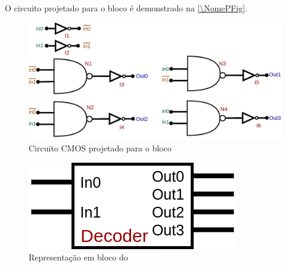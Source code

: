 O circuito projetado para o bloco \'e demonstrado na \autoref{\NomePFig}.

\begin{figure}[htbp]
 \centering
    \centering
    \caption{\label{\NomePFig}Circuito CMOS projetado para o bloco \NomeBloco}
    \includegraphics[scale=0.3]{Circuitos/decoder.png}
\end{figure}

\begin{figure}[htbp]
 \centering
    \centering
    \caption{\label{\NomeSFig}Representação em bloco do \NomeBloco} 
    \includegraphics[scale=0.3]{Circuitos/decoder_block.png}
\end{figure}